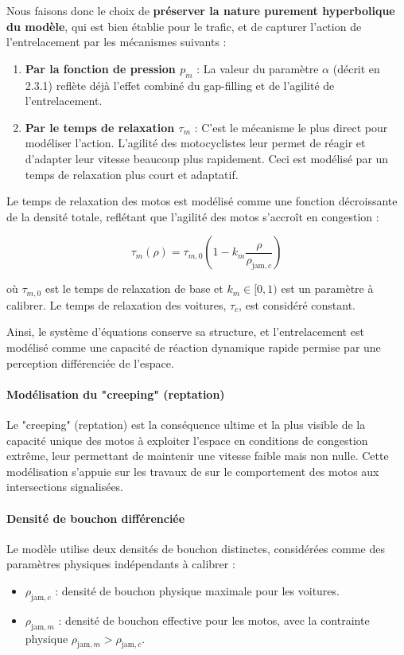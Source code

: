 Nous faisons donc le choix de \textbf{préserver la nature purement hyperbolique du modèle}, qui est bien établie pour le trafic, et de capturer l'action de l'entrelacement par les mécanismes suivants :
\begin{enumerate}
    \item \textbf{Par la fonction de pression $p_m$} : La valeur du paramètre $\alpha$ (décrit en 2.3.1) reflète déjà l'effet combiné du gap-filling et de l'agilité de l'entrelacement.
    \item \textbf{Par le temps de relaxation $\tau_m$} : C'est le mécanisme le plus direct pour modéliser l'action. L'agilité des motocyclistes leur permet de réagir et d'adapter leur vitesse beaucoup plus rapidement. Ceci est modélisé par un temps de relaxation plus court et adaptatif.
\end{enumerate}

Le temps de relaxation des motos est modélisé comme une fonction décroissante de la densité totale, reflétant que l'agilité des motos s'accroît en congestion :

\begin{equation}
    \tau_m(\rho) = \tau_{m,0} \left(1 - k_m \frac{\rho}{\rho_{\text{jam},c}}\right)
\end{equation}

où $\tau_{m,0}$ est le temps de relaxation de base et $k_m \in [0,1)$ est un paramètre à calibrer. Le temps de relaxation des voitures, $\tau_c$, est considéré constant.

Ainsi, le système d'équations conserve sa structure, et l'entrelacement est modélisé comme une capacité de réaction dynamique rapide permise par une perception différenciée de l'espace.

\paragraph{Modélisation du "creeping" (reptation)}
Le "creeping" (reptation) est la conséquence ultime et la plus visible de la capacité unique des motos à exploiter l'espace en conditions de congestion extrême, leur permettant de maintenir une vitesse faible mais non nulle. Cette modélisation s'appuie sur les travaux de \cite{Minh2006} sur le comportement des motos aux intersections signalisées.

\paragraph{Densité de bouchon différenciée}
Le modèle utilise deux densités de bouchon distinctes, considérées comme des paramètres physiques indépendants à calibrer :
\begin{itemize}
    \item $\rho_{\text{jam},c}$ : densité de bouchon physique maximale pour les voitures.
    \item $\rho_{\text{jam},m}$ : densité de bouchon effective pour les motos, avec la contrainte physique $\rho_{\text{jam},m} > \rho_{\text{jam},c}$.
\end{itemize}

